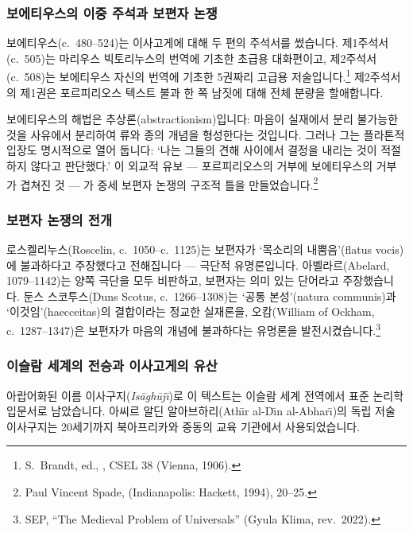 \documentclass[12pt, a4paper]{article}
\begin{document}
\subsubsection{보에티우스의 이중 주석과 보편자 논쟁}

보에티우스(c.\ 480--524)는 이사고게에 대해 두 편의 주석서를 썼습니다. 제1주석서(c.\ 505)는 마리우스 빅토리누스의 번역에 기초한 초급용 대화편이고, 제2주석서(c.\ 508)는 보에티우스 자신의 번역에 기초한 5권짜리 고급용 저술입니다.\footnote{S.\ Brandt, ed., , CSEL 38 (Vienna, 1906).} 제2주석서의 제1권은 포르피리오스 텍스트 불과 한 쪽 남짓에 대해 전체 분량을 할애합니다.

보에티우스의 해법은 추상론(abstractionism)입니다: 마음이 실재에서 분리 불가능한 것을 사유에서 분리하여 류와 종의 개념을 형성한다는 것입니다. 그러나 그는 플라톤적 입장도 명시적으로 열어 둡니다: `나는 그들의 견해 사이에서 결정을 내리는 것이 적절하지 않다고 판단했다.' 이 외교적 유보 --- 포르피리오스의 거부에 보에티우스의 거부가 겹쳐진 것 --- 가 중세 보편자 논쟁의 구조적 틀을 만들었습니다.\footnote{Paul Vincent Spade,  (Indianapolis: Hackett, 1994), 20--25.}

\subsubsection{보편자 논쟁의 전개}

로스켈리누스(Roscelin, c.\ 1050--c.\ 1125)는 보편자가 `목소리의 내뿜음'(flatus vocis)에 불과하다고 주장했다고 전해집니다 --- 극단적 유명론입니다. 아벨라르(Abelard, 1079--1142)는 양쪽 극단을 모두 비판하고, 보편자는 의미 있는 단어라고 주장했습니다. 둔스 스코투스(Duns Scotus, c.\ 1266--1308)는 `공통 본성'(natura communis)과 `이것임'(haecceitas)의 결합이라는 정교한 실재론을, 오캄(William of Ockham, c.\ 1287--1347)은 보편자가 마음의 개념에 불과하다는 유명론을 발전시켰습니다.\footnote{SEP, ``The Medieval Problem of Universals'' (Gyula Klima, rev.\ 2022).}

\subsubsection{이슬람 세계의 전승과 이사고게의 유산}

아랍어화된 이름 이사구지(\textit{Is\=agh\=uj\={\i}})로 이 텍스트는 이슬람 세계 전역에서 표준 논리학 입문서로 남았습니다. 아씨르 알딘 알아브하리(Ath\={\i}r al-D\={\i}n al-Abhar\={\i})의 독립 저술 이사구지는 20세기까지 북아프리카와 중동의 교육 기관에서 사용되었습니다.
\end{document}
